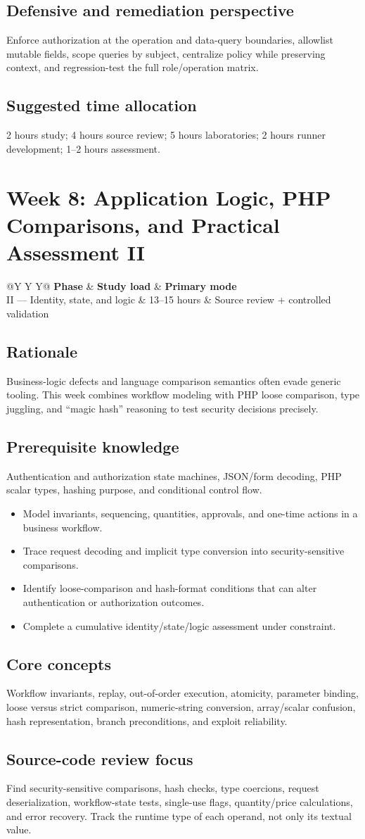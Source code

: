 \documentclass[11pt]{article}
\makeatletter
\newcommand{\weekheader}[4]{%
  \clearpage
  \section{Week #1: #2}
  \begin{tcolorbox}[colback=Navy,colframe=Navy,coltext=white]
    \begin{tabularx}{\linewidth}{@{}Y Y Y@{}}
      \textbf{Phase} & \textbf{Study load} & \textbf{Primary mode}\\
      #3 & #4 hours & Source review + controlled validation
    \end{tabularx}
  \end{tcolorbox}
}
\newcommand{\weekfield}[2]{%
  \Needspace{5\baselineskip}
  \subsection*{#1}
  #2
}
\makeatother
\begin{document}
\weekfield{Defensive and remediation perspective}{Enforce authorization at the
operation and data-query boundaries, allowlist mutable fields, scope queries by
subject, centralize policy while preserving context, and regression-test the full
role/operation matrix.}

\weekfield{Suggested time allocation}{2 hours study; 4 hours source review; 5
hours laboratories; 2 hours runner development; 1--2 hours assessment.}

\weekheader{8}{Application Logic, PHP Comparisons, and Practical Assessment II}{II --- Identity, state, and logic}{13--15}

\weekfield{Rationale}{Business-logic defects and language comparison semantics
often evade generic tooling. This week combines workflow modeling with PHP loose
comparison, type juggling, and ``magic hash'' reasoning to test security decisions
precisely.}

\weekfield{Prerequisite knowledge}{Authentication and authorization state
machines, JSON/form decoding, PHP scalar types, hashing purpose, and conditional
control flow.}

\begin{objectivebox}
\begin{itemize}
  \item Model invariants, sequencing, quantities, approvals, and one-time actions in a business workflow.
  \item Trace request decoding and implicit type conversion into security-sensitive comparisons.
  \item Identify loose-comparison and hash-format conditions that can alter authentication or authorization outcomes.
  \item Complete a cumulative identity/state/logic assessment under constraint.
\end{itemize}
\end{objectivebox}

\weekfield{Core concepts}{Workflow invariants, replay, out-of-order execution,
atomicity, parameter binding, loose versus strict comparison, numeric-string
conversion, array/scalar confusion, hash representation, branch preconditions,
and exploit reliability.}

\weekfield{Source-code review focus}{Find security-sensitive comparisons,
hash checks, type coercions, request deserialization, workflow-state tests,
single-use flags, quantity/price calculations, and error recovery. Track the
runtime type of each operand, not only its textual value.}
\end{document}

